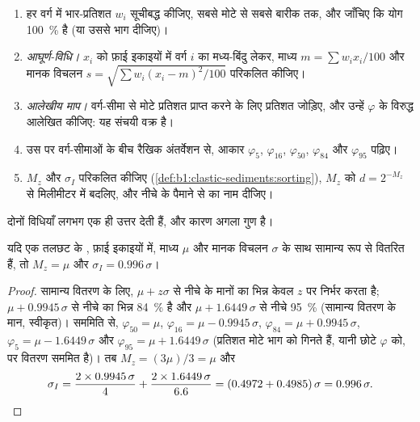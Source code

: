 \begin{method}[छलनी-विश्लेषण से माध्य और छँटाव]\label{met:b1:clastic-sediments:graphic}
\begin{enumerate}
  \item हर वर्ग में भार-प्रतिशत $w_i$ सूचीबद्ध कीजिए, सबसे मोटे से सबसे बारीक तक, और जाँचिए कि योग \qty{100}{\percent} है (या उससे भाग दीजिए)।
  \item \emph{आघूर्ण-विधि।} $x_i$ को फ़ाई इकाइयों में वर्ग $i$ का मध्य-बिंदु लेकर, माध्य $m = \sum w_i x_i / 100$ और मानक विचलन $s = \sqrt{\sum w_i (x_i - m)^2 / 100}$ परिकलित कीजिए।
  \item \emph{आलेखीय माप।} वर्ग-सीमा से मोटे प्रतिशत प्राप्त करने के लिए प्रतिशत जोड़िए, और उन्हें $\varphi$ के विरुद्ध आलेखित कीजिए: यह संचयी वक्र है।
  \item उस पर वर्ग-सीमाओं के बीच रैखिक अंतर्वेशन से, आकार $\varphi_5$, $\varphi_{16}$, $\varphi_{50}$, $\varphi_{84}$ और $\varphi_{95}$ पढ़िए।
  \item $M_z$ और $\sigma_I$ परिकलित कीजिए (\cref{def:b1:clastic-sediments:sorting}), $M_z$ को $d = 2^{-M_z}$ से मिलीमीटर में बदलिए, और नीचे के पैमाने से  का नाम दीजिए।
\end{enumerate}
\end{method}

दोनों विधियाँ लगभग एक ही उत्तर देती हैं, और कारण अगला गुण है।

\begin{proposition}[एक सामान्य वितरण के आलेखीय माप]\label{prop:b1:clastic-sediments:normal}
यदि एक तलछट के , फ़ाई इकाइयों में, माध्य $\mu$ और मानक विचलन $\sigma$ के साथ सामान्य रूप से वितरित हैं, तो $M_z = \mu$ और $\sigma_I = 0.996\,\sigma$।
\end{proposition}

\begin{proof}
सामान्य वितरण के लिए, $\mu + z\sigma$ से नीचे के मानों का भिन्न केवल $z$ पर निर्भर करता है; $\mu + 0.9945\,\sigma$ से नीचे का भिन्न \qty{84}{\percent} है
और $\mu + 1.6449\,\sigma$ से नीचे \qty{95}{\percent} (सामान्य वितरण के मान, स्वीकृत)। सममिति से, $\varphi_{50} = \mu$, $\varphi_{16} = \mu -
0.9945\,\sigma$, $\varphi_{84} = \mu + 0.9945\,\sigma$, $\varphi_5 = \mu -
1.6449\,\sigma$ और $\varphi_{95} = \mu + 1.6449\,\sigma$ (प्रतिशत मोटे भाग को गिनते हैं, यानी छोटे $\varphi$ को, पर वितरण सममित है)। तब $M_z = (3\mu)/3 = \mu$ और
\[
  \sigma_I = \frac{2 \times 0.9945\,\sigma}{4} + \frac{2 \times 1.6449\,\sigma}{6.6}
  = (0.4972 + 0.4985)\,\sigma = 0.996\,\sigma. \qedhere
\]
\end{proof}

